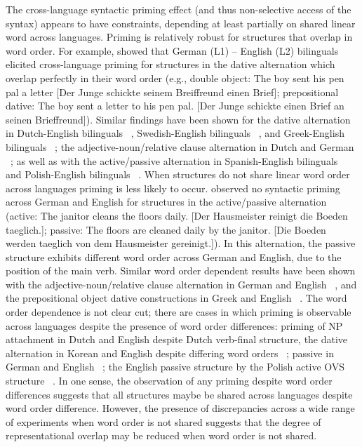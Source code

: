 The cross-language syntactic priming effect (and thus non-selective access of the syntax) appears to have constraints, depending at least partially on shared linear word across languages. Priming is relatively robust for structures that overlap in word order. For example,  \citet{Loebell2003} showed that German (L1) -- English (L2) bilinguals elicited cross-language priming for structures in the dative alternation which overlap perfectly in their word order (e.g., double object: The boy sent his pen pal a letter [Der Junge schickte seinem Breiffreund einen Brief]; prepositional dative: The boy sent a letter to his pen pal. [Der Junge schickte einen Brief an seinen Brieffreund]). Similar findings have been shown for the dative alternation in Dutch-English bilinguals ~\citep{Schoonbaert2007}, Swedish-English bilinguals ~\citep{Kantola2011}, and Greek-English bilinguals ~\citep{Salamoura2007}; the adjective-noun\slash relative clause alternation in Dutch and German ~\citep{Bernolet2007}; as well as with the active\slash passive alternation in Spanish-English bilinguals ~\citep{Hartsuiker2004} and Polish-English bilinguals ~\citep{Fleischer2012}. When structures do not share linear word order across languages priming is less likely to occur.  \citet{Loebell2003} observed no syntactic priming across German and English for structures in the active\slash passive alternation (active: The janitor cleans the floors daily. [Der Hausmeister reinigt die Boeden taeglich.]; passive: The floors are cleaned daily by the janitor. [Die Boeden werden taeglich von dem Hausmeister gereinigt.]). In this alternation, the passive structure exhibits different word order across German and English, due to the position of the main verb. Similar word order dependent results have been shown with the adjective-noun\slash relative clause alternation in German and English ~\citep{Bernolet2007}, and the prepositional object dative constructions in Greek and English ~\citep{Salamoura2007}. The word order dependence is not clear cut; there are cases in which priming is observable across languages despite the presence of word order differences: priming of NP attachment in Dutch and English despite Dutch verb-final structure, the dative alternation in Korean and English despite differing word orders ~\citep[Korean: SOV; English: SVO;][]{Shin2009}; passive in German and English ~\citep{Weber2009}; the English passive structure by the Polish active OVS structure ~\citep{Fleischer2012}. In one sense, the observation of any priming despite word order differences suggests that all structures maybe be shared across languages despite word order difference. However, the presence of discrepancies across a wide range of experiments when word order is not shared suggests that the degree of representational overlap may be reduced when word order is not shared. 

